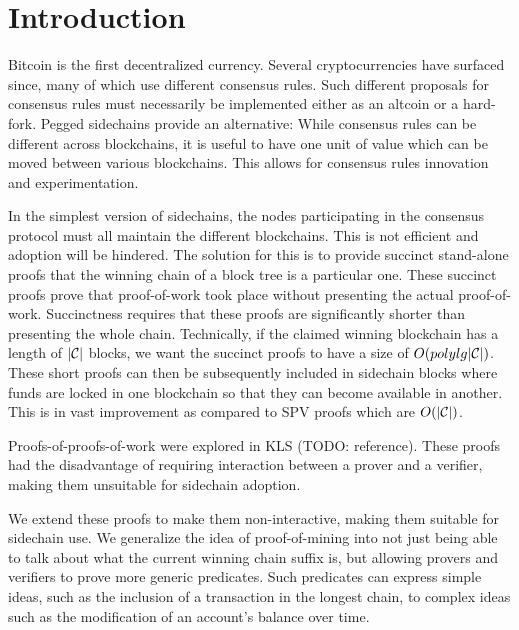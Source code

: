 \section{Introduction}

Bitcoin \cite{bitcoin} is the first decentralized currency. Several
cryptocurrencies have surfaced since, many of which use different consensus
rules. Such different proposals for consensus rules must necessarily be
implemented either as an altcoin or a hard-fork. Pegged sidechains provide an
alternative: While consensus rules can be different across blockchains, it is
useful to have one unit of value which can be moved between various
blockchains. This allows for consensus rules innovation and experimentation.

In the simplest version of sidechains, the nodes participating in the consensus
protocol must all maintain the different blockchains. This is not efficient and
adoption will be hindered. The solution for this is to provide succinct
stand-alone proofs that the winning chain of a block tree is a particular one.
These succinct proofs prove that proof-of-work took place without presenting
the actual proof-of-work. Succinctness requires that these proofs are
significantly shorter than presenting the whole chain. Technically, if the
claimed winning blockchain has a length of $|\mathcal{C}|$ blocks, we want the
succinct proofs to have a size of $O(polylg|\mathcal{C}|)$. These short proofs can
then be subsequently included in sidechain blocks where funds are locked in one
blockchain so that they can become available in another. This is in vast
improvement as compared to SPV proofs which are $O(|\mathcal{C}|)$.

Proofs-of-proofs-of-work were explored in KLS (TODO: reference). These proofs
had the disadvantage of requiring interaction between a prover and a verifier,
making them unsuitable for sidechain adoption.

We extend these proofs to make them non-interactive, making them suitable for
sidechain use. We generalize the idea of proof-of-mining into not just being
able to talk about what the current winning chain suffix is, but allowing
provers and verifiers to prove more generic predicates. Such predicates can
express simple ideas, such as the inclusion of a transaction in the longest
chain, to complex ideas such as the modification of an account's balance over
time.

